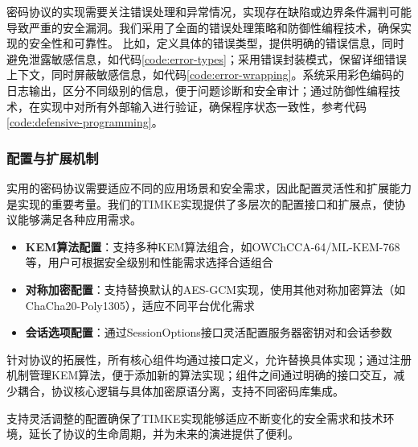 密码协议的实现需要关注错误处理和异常情况，实现存在缺陷或边界条件漏判可能导致严重的安全漏洞。我们采用了全面的错误处理策略和防御性编程技术，确保实现的安全性和可靠性。
比如，定义具体的错误类型，提供明确的错误信息，同时避免泄露敏感信息，如代码\ref{code:error-types}；采用错误封装模式，保留详细错误上下文，同时屏蔽敏感信息，如代码\ref{code:error-wrapping}。系统采用彩色编码的日志输出，区分不同级别的信息，便于问题诊断和安全审计；通过防御性编程技术，在实现中对所有外部输入进行验证，确保程序状态一致性，参考代码\ref{code:defensive-programming}。

\subsubsection{配置与扩展机制}
\label{subsubsec:configurability}
实用的密码协议需要适应不同的应用场景和安全需求，因此配置灵活性和扩展能力是实现的重要考量。我们的TIMKE实现提供了多层次的配置接口和扩展点，使协议能够满足各种应用需求。

\begin{itemize}
    \item \textbf{KEM算法配置}：支持多种KEM算法组合，如OWChCCA-64/ML-KEM-768等，用户可根据安全级别和性能需求选择合适组合
    
    \item \textbf{对称加密配置}：支持替换默认的AES-GCM实现，使用其他对称加密算法（如ChaCha20-Poly1305），适应不同平台优化需求
    
    \item \textbf{会话选项配置}：通过SessionOptions接口灵活配置服务器密钥对和会话参数
\end{itemize}

针对协议的拓展性，所有核心组件均通过接口定义，允许替换具体实现；通过注册机制管理KEM算法，便于添加新的算法实现；组件之间通过明确的接口交互，减少耦合，协议核心逻辑与具体加密原语分离，支持不同密码库集成。

支持灵活调整的配置确保了TIMKE实现能够适应不断变化的安全需求和技术环境，延长了协议的生命周期，并为未来的演进提供了便利。